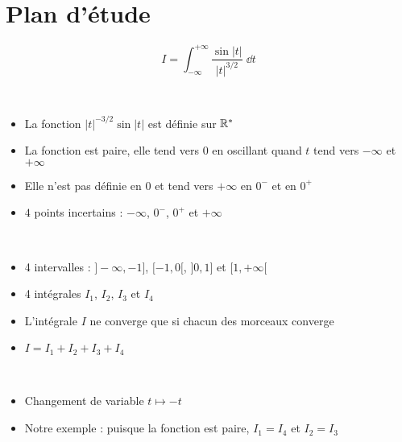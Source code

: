 \section*{Plan d'étude}

\begin{frame}


\vspace*{-3ex}

\begin{minipage}{0.29\textwidth}
$$I = \int_{-\infty}^{+\infty} \frac{\sin |t|}{|t|^{3/2}}\;\dd t$$  
\end{minipage}
\begin{minipage}{0.69\textwidth}
\end{minipage}

	\pause

\\
\pause
\begin{itemize}
  \item La fonction $|t|^{-3/2}\sin |t|$ est définie sur $\mathbb{R}^*$
  \pause
  \item La fonction est paire, elle tend vers $0$ en
oscillant quand $t$ tend vers $-\infty$ et $+\infty$
\pause
  \item Elle n'est pas définie en $0$ et
tend vers $+\infty$ en $0^-$ et en $0^+$
\pause
  \item $4$ points incertains : $-\infty$, $0^-$, $0^+$ et $+\infty$
\end{itemize}
\end{frame}



\begin{frame}

\\
\pause
\begin{itemize}
  \item 4 intervalles : $]-\infty,-1]$, $[-1,0[$, $]0,1]$ et $[1,+\infty[$
  \pause
  \item 4 intégrales $I_1$, $I_2$, $I_3$ et $I_4$
  \pause
  \item L'intégrale $I$ ne converge que si chacun des
morceaux converge
\pause
  \item $I=I_1+I_2+I_3+I_4$
\end{itemize}

\bigskip
\pause 
{}\\
\pause
\begin{itemize}
  \item Changement de variable $t\mapsto -t$
  \pause
  \item Notre exemple : puisque la fonction est paire,
$I_1=I_4$ et $I_2=I_3$
\end{itemize}

\end{frame}



